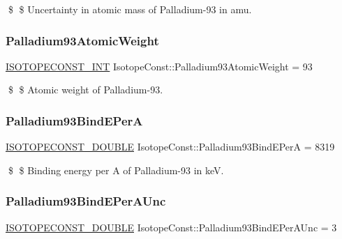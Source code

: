 \$ \$ Uncertainty in atomic mass of Palladium-\/93 in amu. \mbox{\label{group___isotope_const-_palladium-_pd93_ga292ee99c6077ce2a90415f98c3b05d04}} 
\subsubsection{\texorpdfstring{Palladium93\+Atomic\+Weight}{Palladium93AtomicWeight}}
{\footnotesize\ttfamily \mbox{\hyperlink{group___isotope_const-_macros_ga5f18360b3e99483a35c32d789e62621c}{I\+S\+O\+T\+O\+P\+E\+C\+O\+N\+S\+T\+\_\+\+I\+NT}} Isotope\+Const\+::\+Palladium93\+Atomic\+Weight = 93}

\$ \$ Atomic weight of Palladium-\/93. \mbox{\label{group___isotope_const-_palladium-_pd93_ga83d5b5748a118eb8a2d2ba650d7d6d70}} 
\subsubsection{\texorpdfstring{Palladium93\+Bind\+E\+PerA}{Palladium93BindEPerA}}
{\footnotesize\ttfamily \mbox{\hyperlink{group___isotope_const-_macros_ga8f45a7272ce02c0b4c65c44636ed719a}{I\+S\+O\+T\+O\+P\+E\+C\+O\+N\+S\+T\+\_\+\+D\+O\+U\+B\+LE}} Isotope\+Const\+::\+Palladium93\+Bind\+E\+PerA = 8319}

\$ \$ Binding energy per A of Palladium-\/93 in keV. \mbox{\label{group___isotope_const-_palladium-_pd93_ga01ca566af2d9a34b4cd63166faa177eb}} 
\subsubsection{\texorpdfstring{Palladium93\+Bind\+E\+Per\+A\+Unc}{Palladium93BindEPerAUnc}}
{\footnotesize\ttfamily \mbox{\hyperlink{group___isotope_const-_macros_ga8f45a7272ce02c0b4c65c44636ed719a}{I\+S\+O\+T\+O\+P\+E\+C\+O\+N\+S\+T\+\_\+\+D\+O\+U\+B\+LE}} Isotope\+Const\+::\+Palladium93\+Bind\+E\+Per\+A\+Unc = 3}

